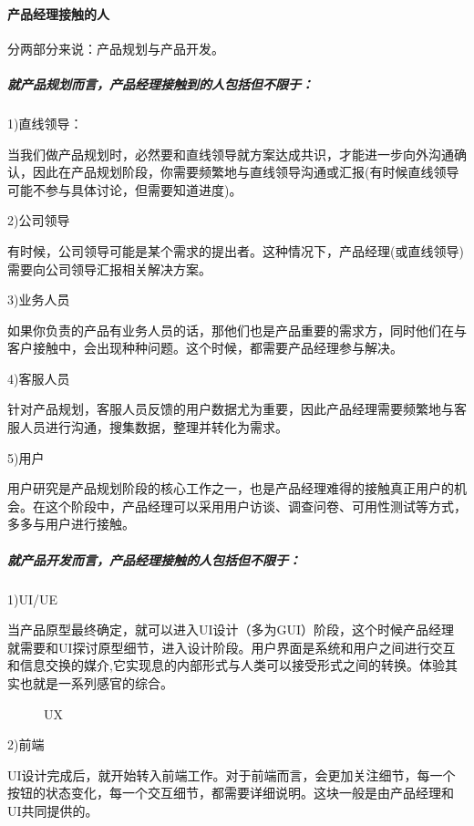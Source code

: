 \documentclass[letterpaper,11pt,english]{sphinxmanual}
\begin{document}
\paragraph{产品经理接触的人}
\label{\detokenize{chapter_introduction/PM:id11}}
分两部分来说：产品规划与产品开发。


\subparagraph{就产品规划而言，产品经理接触到的人包括但不限于：}
\label{\detokenize{chapter_introduction/PM:prod-people}}\label{\detokenize{chapter_introduction/PM:id12}}
1)直线领导：

当我们做产品规划时，必然要和直线领导就方案达成共识，才能进一步向外沟通确认，因此在产品规划阶段，你需要频繁地与直线领导沟通或汇报(有时候直线领导可能不参与具体讨论，但需要知道进度)。

2)公司领导

有时候，公司领导可能是某个需求的提出者。这种情况下，产品经理(或直线领导)需要向公司领导汇报相关解决方案。

3)业务人员

如果你负责的产品有业务人员的话，那他们也是产品重要的需求方，同时他们在与客户接触中，会出现种种问题。这个时候，都需要产品经理参与解决。

4)客服人员

针对产品规划，客服人员反馈的用户数据尤为重要，因此产品经理需要频繁地与客服人员进行沟通，搜集数据，整理并转化为需求。

5)用户

用户研究是产品规划阶段的核心工作之一，也是产品经理难得的接触真正用户的机会。在这个阶段中，产品经理可以采用用户访谈、调查问卷、可用性测试等方式，多多与用户进行接触。


\subparagraph{就产品开发而言，产品经理接触的人包括但不限于：}
\label{\detokenize{chapter_introduction/PM:id13}}
1)UI/UE

当产品原型最终确定，就可以进入UI设计（多为GUI）阶段，这个时候产品经理就需要和UI探讨原型细节，进入设计阶段。用户界面是系统和用户之间进行交互和信息交换的媒介,它实现息的内部形式与人类可以接受形式之间的转换。体验其实也就是一系列感官的综合。

\begin{figure}[H]
\centering
\capstart

\noindent{}
\caption{UX}\label{\detokenize{chapter_introduction/PM:id32}}\end{figure}

2)前端

UI设计完成后，就开始转入前端工作。对于前端而言，会更加关注细节，每一个按钮的状态变化，每一个交互细节，都需要详细说明。这块一般是由产品经理和UI共同提供的。
\end{document}
